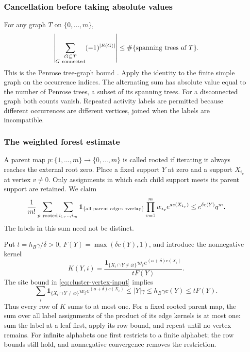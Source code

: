 \subsubsection{Cancellation before taking absolute values}
For any graph $T$ on $\{0,\ldots,m\}$,
\begin{equation}\label{eq:cluster-tree-graph}
 \left|\sum_{\substack{G\subseteq T\\G\ {\rm connected}}}
                      (-1)^{|E(G)|}\right|
                      \le\#\{\text{spanning trees of }T\}.
\end{equation}
This is the Penrose tree-graph bound
\cite[Proposition~5, Eq.~(4.3)]{FernandezProcacci}. Apply the identity
to the finite simple graph on the occurrence indices. The alternating
sum has absolute value equal to the number of Penrose trees, a subset
of its spanning trees. For a disconnected graph both counts vanish.
Repeated activity labels are permitted because different occurrences
are different vertices, joined when the labels are incompatible.

\subsubsection{The weighted forest estimate}
A parent map $p:\{1,\ldots,m\}\to\{0,\ldots,m\}$ is called rooted
if iterating it always reaches the external root zero. Place a fixed
support $Y$ at zero and a support $X_{i_v}$ at vertex $v\ne0$.
Only assignments in which each child support meets its parent support
are retained. We claim
\begin{equation}\label{eq:cluster-forest-bound}
 \frac1{m!}\sum_{p\ {\rm rooted}}\sum_{i_1,\ldots,i_m}
 \mathbf1_{\{\text{all parent edges overlap}\}}
       \prod_{v=1}^m w_{i_v}e^{a c(X_{i_v})}
                            \le e^{\delta c(Y)}q^m.
\end{equation}
The labels in this sum need not be distinct.

Put $t=h_B\gamma/\delta>0$, $F(Y)=\max(\delta c(Y),1)$, and
introduce the nonnegative kernel
\[
 K(Y,i)=\frac{\mathbf1_{\{X_i\cap Y\ne\varnothing\}}
                        w_i e^{(a+\delta)c(X_i)}}{tF(Y)}.
\]
The site bound in \eqref{eq:cluster-vertex-input} implies
\[
 \sum_i\mathbf1_{\{X_i\cap Y\ne\varnothing\}}
                w_i e^{(a+\delta)c(X_i)}
       \le |Y|\gamma\le h_B\gamma c(Y)\le tF(Y).
\]
Thus every row of $K$ sums to at most one. For a fixed rooted parent
map, the sum over all label assignments of the product of its edge
kernels is at most one: sum the label at a leaf first, apply its row
bound, and repeat until no vertex remains. For infinite alphabets
one first restricts to a finite alphabet; the row bounds still hold,
and nonnegative convergence removes the restriction.

